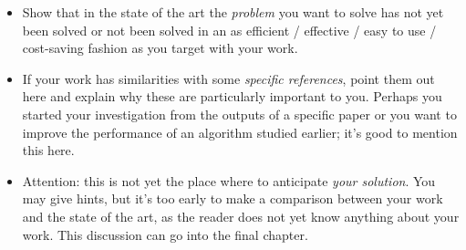 \begin{itemize}
\item[\Square] Show that in the state of the art the \emph{problem} you want to solve has not yet been solved or not been solved in an as efficient / effective / easy to use / cost-saving fashion as you target with your work.
\item[\Square] If your work has similarities with some \emph{specific references}, point them out here and explain why these are particularly important to you. Perhaps you started your investigation from the outputs of a specific paper or you want to improve the performance of an algorithm studied earlier; it's good to mention this here.
\item[\Square] Attention: this is not yet the place where to anticipate \emph{your solution}. You may give hints, but it's too early to make a comparison between your work and the state of the art, as the reader does not yet know anything about your work. This discussion can go into the final chapter.
\end{itemize}

\fi
